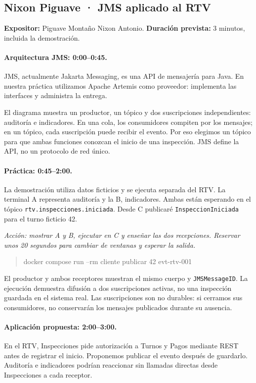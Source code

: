 \subsection{Nixon Piguave · JMS aplicado al RTV}
\noindent\textbf{Expositor:} Piguave Montaño Nixon Antonio. \textbf{Duración prevista:} 3 minutos, incluida la demostración.

\paragraph{Arquitectura JMS: 0:00--0:45.}
JMS, actualmente Jakarta Messaging, es una API de mensajería para Java. En nuestra práctica utilizamos Apache Artemis como proveedor: implementa las interfaces y administra la entrega.

El diagrama muestra un productor, un tópico y dos suscripciones independientes: auditoría e indicadores. En una cola, los consumidores compiten por los mensajes; en un tópico, cada suscripción puede recibir el evento. Por eso elegimos un tópico para que ambas funciones conozcan el inicio de una inspección. JMS define la API, no un protocolo de red único.\cite{jakarta2022}

\paragraph{Práctica: 0:45--2:00.}
La demostración utiliza datos ficticios y se ejecuta separada del RTV. La terminal A representa auditoría y la B, indicadores. Ambas están esperando en el tópico \texttt{rtv.inspecciones.iniciada}. Desde C publicaré \texttt{InspeccionIniciada} para el turno ficticio 42.

\noindent\textit{Acción: mostrar A y B, ejecutar en C y enseñar las dos recepciones. Reservar unos 20 segundos para cambiar de ventanas y esperar la salida.}
\begin{quote}\small\ttfamily
docker compose run --rm cliente publicar 42 evt-rtv-001
\end{quote}

El productor y ambos receptores muestran el mismo cuerpo y \texttt{JMSMessageID}. La ejecución demuestra difusión a dos suscripciones activas, no una inspección guardada en el sistema real. Las suscripciones son no durables: si cerramos sus consumidores, no conservarán los mensajes publicados durante su ausencia.

\paragraph{Aplicación propuesta: 2:00--3:00.}
En el RTV, Inspecciones pide autorización a Turnos y Pagos mediante REST antes de registrar el inicio. Proponemos publicar el evento después de guardarlo. Auditoría e indicadores podrían reaccionar sin llamadas directas desde Inspecciones a cada receptor.

